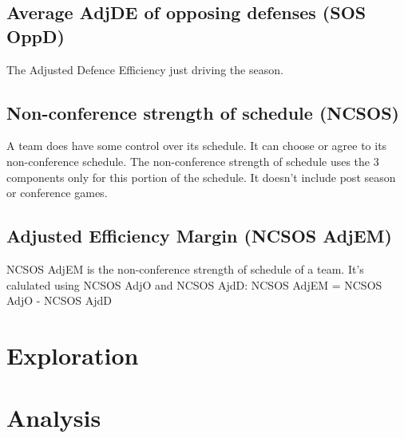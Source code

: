 \documentclass[
10pt, %
a4paper, %
oneside, %
headinclude,footinclude, %
BCOR5mm, %
]{scrartcl}
\begin{document}
\begin{description}
\begin{description}
	\subsection{Average AdjDE of opposing defenses (SOS OppD)}
	\begin{description}
		The Adjusted Defence Efficiency just driving the season.
	\end{description}

\end{description}


\subsection{Non-conference strength of schedule (NCSOS)}
\begin{description}
A team does have some control over its schedule. It can choose or agree to its non-conference schedule.
The non-conference strength of schedule uses the 3 components only for this portion of the schedule. It doesn't include post season or conference games.

	\subsection{Adjusted Efficiency Margin (NCSOS AdjEM)}
	\begin{description}
		NCSOS AdjEM is the non-conference strength of schedule of a team.
		It's calulated using NCSOS AdjO and NCSOS AjdD:
		NCSOS AdjEM = NCSOS AdjO - NCSOS AjdD
	\end{description}
\end{description}

\end{description}


\section{Exploration}


\section{Analysis}
\end{document}

